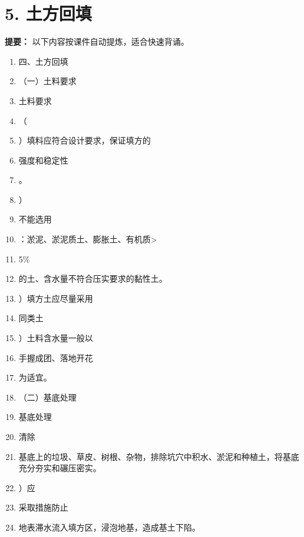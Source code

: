 \documentclass[UTF8,fontset=fandol,11pt]{ctexart}
\begin{document}
\newpage

\section*{5. 土方回填}


\begin{mainbox}

\textbf{提要：} 以下内容按课件自动提炼，适合快速背诵。

\end{mainbox}

\begin{enumerate}[label=\arabic*.]

\item 四、土方回填

\item （一）土料要求

\item 土料要求

\item （

\item ）填料应符合设计要求，保证填方的

\item 强度和稳定性

\item 。

\item ）

\item 不能选用

\item ：淤泥、淤泥质土、膨胀土、有机质>

\item 5\%

\item 的土、含水量不符合压实要求的黏性土。

\item ）填方土应尽量采用

\item 同类土

\item ）土料含水量一般以

\item 手握成团、落地开花

\item 为适宜。

\item （二）基底处理

\item 基底处理

\item 清除

\item 基底上的垃圾、草皮、树根、杂物，排除坑穴中积水、淤泥和种植土，将基底充分夯实和碾压密实。

\item ）应

\item 采取措施防止

\item 地表滞水流入填方区，浸泡地基，造成基土下陷。

\end{enumerate}
\end{document}
